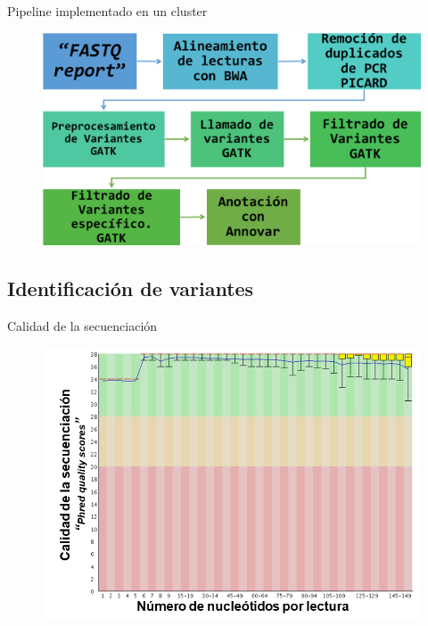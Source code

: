 \documentclass[xcolor=dvipsnames]{beamer}
\begin{document}
\begin{frame}{Pipeline implementado en un cluster}
	
	\begin{figure}
		\includegraphics[width=1\textwidth]{pipeline1}
		
	\end{figure}
	
\end{frame}
\subsection{Identificación de variantes}

\begin{frame}{Calidad de la secuenciación}
	\begin{figure}
			\centering
		\includegraphics[width=0.8\linewidth]{calidadfastq.png}
		\end{figure}
	\end{frame}
\end{document}
